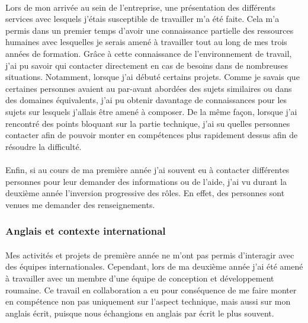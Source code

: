 \documentclass[12pt,a4paper]{report}
\begin{document}
\paragraph*{}Lors de mon arrivée au sein de l'entreprise, une présentation des différents services avec lesquels j'étais susceptible de travailler m'a été faite. Cela m'a permis dans un premier temps d'avoir une connaissance partielle des ressources humaines avec lesquelles je serais amené à travailler tout au long de mes trois années de formation. Grâce à cette connaissance de l'environnement de travail, j'ai pu savoir qui contacter directement en cas de besoins dans de nombreuses situations. Notamment, lorsque j'ai débuté certains projets. Comme je savais que certaines personnes avaient au par-avant abordées des sujets similaires ou dans des domaines équivalents, j'ai pu obtenir davantage de connaissances pour les sujets sur lesquels j'allais être amené à composer. De la même façon, lorsque j'ai rencontré des points bloquant sur la partie technique, j'ai su quelles personnes contacter afin de pouvoir monter en compétences plus rapidement dessus afin de résoudre la difficulté.
\paragraph*{}Enfin, si au cours de ma première année j'ai souvent eu à contacter différentes personnes pour leur demander des informations ou de l'aide, j'ai vu durant la deuxième année l'inversion progressive des rôles. En effet, des personnes sont venues me demander des renseignements. \\
\subsubsection{Anglais et contexte international}
\paragraph*{}Mes activités et projets de première année ne m'ont pas permis d'interagir avec des équipes internationales. Cependant, lors de ma deuxième année j'ai été amené à travailler avec un membre d'une équipe de conception et développement roumaine. Ce travail en collaboration a eu pour conséquence de me faire monter en compétence non pas uniquement sur l'aspect technique, mais aussi sur mon anglais écrit, puisque nous échangions en anglais par écrit le plus souvent.
\end{document}

